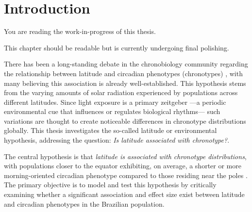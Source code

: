 \documentclass[
12pt,
openright,
oneside,
a4paper,
chapter=TITLE,
section=TITLE,
french,
spanish,
brazil,
english
]{abntex2}\usepackage{array}
\newcommand{\microskip}{\vspace{\microskipamount}}
\renewcommand{\contentsname}{Contents}
\renewcommand{\contentsname}{Sumário}
\renewcommand{\contentsname}{Sumario}
\renewcommand{\contentsname}{Sommaire}
\renewcommand{\textual}{
  \pagestyle{abntheadings}
  \aliaspagestyle{chapter}{abntheadings}
}
\renewcommand*\contentsname{Table of contents}
\newcommand\contentsname{Table of contents}
\begin{document}

\pdfbookmark[0]{\contentsname}{toc}
\tableofcontents*
\cleardoublepage


\textual
{}

\chapter{Introduction}\label{introduction}

\begin{tcolorbox}[enhanced jigsaw, coltitle=black, opacitybacktitle=0.6, colframe=quarto-callout-note-color-frame, arc=.35mm, colbacktitle=quarto-callout-note-color!10!white, titlerule=0mm, title=\textcolor{quarto-callout-note-color}{\faInfo}\hspace{0.5em}{Note}, breakable, bottomrule=.15mm, rightrule=.15mm, bottomtitle=1mm, left=2mm, opacityback=0, toprule=.15mm, leftrule=.75mm, toptitle=1mm, colback=white]

You are reading the work-in-progress of this thesis.

\microskip

This chapter should be readable but is currently undergoing final
polishing.

\end{tcolorbox}

There has been a long-standing debate in the chronobiology community
regarding the relationship between latitude and circadian phenotypes
(chronotypes)
\autocite{randler2008,leocadio-miguel2017,zerbini2021,skeldon2021}, with
many believing this association is already well-established. This
hypothesis stems from the varying amounts of solar radiation experienced
by populations across different latitudes. Since light exposure is a
primary zeitgeber ---a periodic environmental cue that influences or
regulates biological rhythms--- such variations are thought to create
noticeable differences in chronotype distributions globally. This thesis
investigates the so-called latitude or environmental hypothesis,
addressing the question: \emph{Is latitude associated with chronotype?}.

The central hypothesis is that \emph{latitude is associated with
chronotype distributions}, with populations closer to the equator
exhibiting, on average, a shorter or more morning-oriented circadian
phenotype compared to those residing near the poles
\autocite{hut2013,leocadio-miguel2014,leocadio-miguel2017,pittendrigh1991,randler2008,randler2017,roenneberg2003}.
The primary objective is to model and test this hypothesis by critically
examining whether a significant association and effect size exist
between latitude and circadian phenotypes in the Brazilian population.
\end{document}
